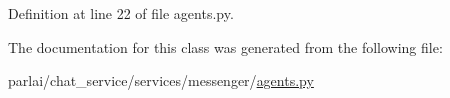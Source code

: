 Definition at line 22 of file agents.\+py.



The documentation for this class was generated from the following file\+:\begin{DoxyCompactItemize}
\item 
parlai/chat\+\_\+service/services/messenger/\hyperlink{parlai_2chat__service_2services_2messenger_2agents_8py}{agents.\+py}\end{DoxyCompactItemize}
